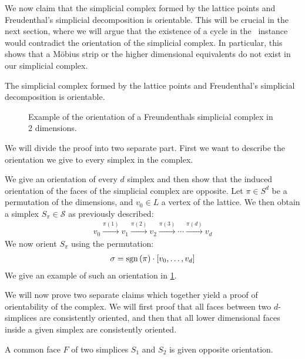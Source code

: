 We now claim that the simplicial complex formed by the lattice points and Freudenthal's simplicial decomposition is orientable. This will be crucial in the next section, where we will argue that the existence of a cycle in the \EndOfLine\ instance would contradict the orientation of the simplicial complex. In particular, this shows that a Möbius strip or the higher dimensional equivalents do not exist in our simplicial complex.

\begin{proposition}\label{prop:orientability_freudenthal}
	The simplicial complex formed by the lattice points and Freudenthal's simplicial decomposition is orientable.
\end{proposition}

\begin{figure}[ht]
	\centering
	\caption[Orientation of a simplicial complex]{Example of the orientation of a Freundenthals simplicial complex in 2 dimensions.}\label{fig:orientation_of_simplicial_complex}
\end{figure}

We will divide the proof into two separate part. First we want to describe the orientation we give to every simplex in the complex.

We give an orientation of every $d$ simplex and then show that the induced orientation of the faces of the simplicial complex are opposite.
Let $\pi \in S^d$ be a permutation of the dimensions, and $v_0 \in L$ a vertex of the lattice. We then obtain a simplex $S_{\pi} \in \mathcal{S}$ as previously described:
\begin{align*}
	v_0 \xrightarrow{\pi(1)} v_1 \xrightarrow{\pi(2)} v_2 \xrightarrow{\pi(3)} \cdots \xrightarrow{\pi(d)} v_d
\end{align*}
We now orient $S_{\pi}$ using the permutation:
\begin{align*}
	\sigma = \operatorname{sgn}\left(\pi\right) \cdot [v_0, \dots, v_d]
\end{align*}
We give an example of such an orientation in \cref{fig:orientation_of_simplicial_complex}.

We will now prove two separate claims which together yield a proof of orientability of the complex. We will first proof that all faces between two $d$-simplices are consistently oriented, and then that all lower dimensional faces inside a given simplex are consistently oriented.

\begin{claim}
	A common face $F$ of two simplices $S_1$ and $S_2$ is given opposite orientation.
\end{claim}

